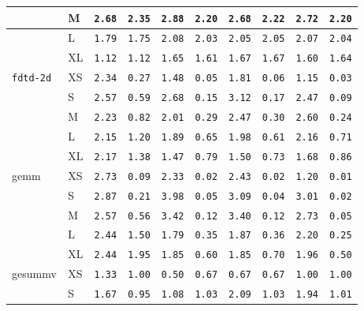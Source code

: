 \begin{tabular}{l | l | l | l | l | l | l | l | l | l}
             & M    & \verb|2.68| & \verb|2.35| & \verb|2.88| & \verb|2.20| & \verb|2.68| & \verb|2.22| & \verb|2.72| & \verb|2.20| \\ \hline
             & L    & \verb|1.79| & \verb|1.75| & \verb|2.08| & \verb|2.03| & \verb|2.05| & \verb|2.05| & \verb|2.07| & \verb|2.04| \\ \hline
             & XL   & \verb|1.12| & \verb|1.12| & \verb|1.65| & \verb|1.61| & \verb|1.67| & \verb|1.67| & \verb|1.60| & \verb|1.64| \\ \hline
    \verb|fdtd-2d | & XS   & \verb|2.34| & \verb|0.27| & \verb|1.48| & \verb|0.05| & \verb|1.81| & \verb|0.06| & \verb|1.15| & \verb|0.03| \\ \hline
             & S    & \verb|2.57| & \verb|0.59| & \verb|2.68| & \verb|0.15| & \verb|3.12| & \verb|0.17| & \verb|2.47| & \verb|0.09| \\ \hline
             & M    & \verb|2.23| & \verb|0.82| & \verb|2.01| & \verb|0.29| & \verb|2.47| & \verb|0.30| & \verb|2.60| & \verb|0.24| \\ \hline
             & L    & \verb|2.15| & \verb|1.20| & \verb|1.89| & \verb|0.65| & \verb|1.98| & \verb|0.61| & \verb|2.16| & \verb|0.71| \\ \hline
             & XL   & \verb|2.17| & \verb|1.38| & \verb|1.47| & \verb|0.79| & \verb|1.50| & \verb|0.73| & \verb|1.68| & \verb|0.86| \\ \hline
    gemm     & XS   & \verb|2.73| & \verb|0.09| & \verb|2.33| & \verb|0.02| & \verb|2.43| & \verb|0.02| & \verb|1.20| & \verb|0.01| \\ \hline
             & S    & \verb|2.87| & \verb|0.21| & \verb|3.98| & \verb|0.05| & \verb|3.09| & \verb|0.04| & \verb|3.01| & \verb|0.02| \\ \hline
             & M    & \verb|2.57| & \verb|0.56| & \verb|3.42| & \verb|0.12| & \verb|3.40| & \verb|0.12| & \verb|2.73| & \verb|0.05| \\ \hline
             & L    & \verb|2.44| & \verb|1.50| & \verb|1.79| & \verb|0.35| & \verb|1.87| & \verb|0.36| & \verb|2.20| & \verb|0.25| \\ \hline
             & XL   & \verb|2.44| & \verb|1.95| & \verb|1.85| & \verb|0.60| & \verb|1.85| & \verb|0.70| & \verb|1.96| & \verb|0.50| \\ \hline
    gesummv  & XS   & \verb|1.33| & \verb|1.00| & \verb|0.50| & \verb|0.67| & \verb|0.67| & \verb|0.67| & \verb|1.00| & \verb|1.00| \\ \hline
             & S    & \verb|1.67| & \verb|0.95| & \verb|1.08| & \verb|1.03| & \verb|2.09| & \verb|1.03| & \verb|1.94| & \verb|1.01| \\ \hline

\end{tabular}
